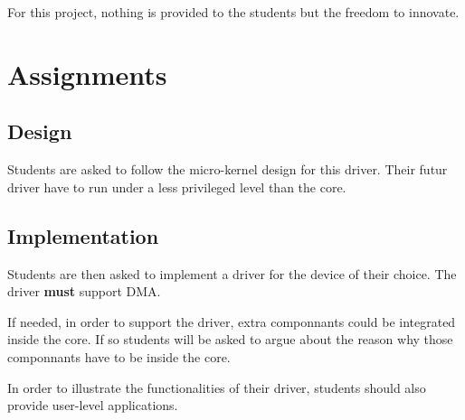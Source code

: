 For this project, nothing is provided to the students but the freedom to
innovate.

%
%

\section{Assignments}


\subsection*{Design}

Students are asked to follow the micro-kernel design for this driver.
Their futur driver have to run under a less privileged level than the
core.


\subsection*{Implementation}

Students are then asked to implement a driver for the device of their
choice. The driver \textbf{must} support DMA.

If needed, in order to support the driver, extra componnants could be
integrated inside the core. If so students will be asked to argue about the
reason why those componnants have to be inside the core.

In order to illustrate the functionalities of their driver, students
should also provide user-level applications.
